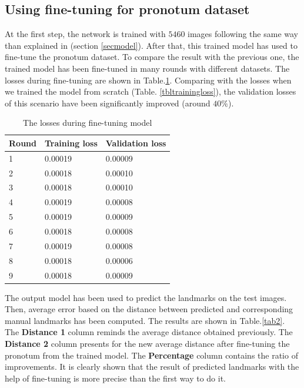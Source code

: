 \documentclass[10pt]{article}
\begin{document}
\subsection{Using fine-tuning for pronotum dataset}

At the first step, the network is trained with $5460$ images following
the same way than explained in (section \ref{secmodel}). After that, 
this trained model has used to fine-tune the pronotum dataset. To compare the result with
the previous one, the trained model has been fine-tuned in many rounds
with different datasets. The losses during fine-tuning are shown in
Table.\ref{tblfinetuningloss}. Comparing with the losses when we
trained the model from scratch (Table. \ref{tbltrainingloss}), the
validation losses of this scenario have been significantly improved (around
$40\%$).

\begin{table}[h!]
	\centering
	\begin{tabular}{l l l}
	Round & Training loss & Validation loss \\ \hline
	1 & 0.00019 & 0.00009  \\ \hline
	2 & 0.00018 & 0.00010 \\ \hline
	3 & 0.00018 & 0.00010 \\ \hline
	4 & 0.00019 & 0.00008 \\ \hline
	5 & 0.00019 & 0.00009 \\ \hline
	6 & 0.00018 & 0.00008 \\ \hline
	7 & 0.00019 & 0.00008 \\ \hline
	8 & 0.00018 & 0.00006 \\ \hline
	9 & 0.00018 & 0.00009 \\ \hline
	\end{tabular}
	\caption{The losses during fine-tuning model}
	\label{tblfinetuningloss}
\end{table}

The output model has been used to predict the landmarks on the test
images. Then, average error based on the distance between
predicted and corresponding manual landmarks has been computed. The results
are shown in Table.\ref{tab2}. The \textbf{Distance 1} column reminds
the average distance obtained previously. The \textbf{Distance 2}
column presents for the new average distance
after fine-tuning the pronotum from the trained model. The
\textbf{Percentage} column contains the ratio of improvements. It is
clearly shown that the result of predicted landmarks with the help of
fine-tuning is more precise than the first way to do it.
\end{document}
